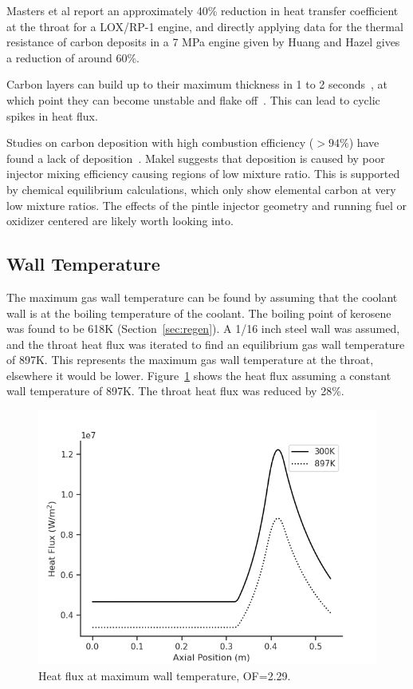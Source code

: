 \documentclass[11pt]{article}
\begin{document}
Masters et al \cite{masters_high-pressure_1988} report an approximately 40\% reduction in heat transfer coefficient at the throat for a LOX/RP-1 engine, and directly applying data for the thermal resistance of carbon deposits in a 7 MPa engine given by Huang and Hazel gives a reduction of around 60\%.

Carbon layers can build up to their maximum thickness in 1 to 2 seconds~\cite{makel_carbon_1990}, at which point they can become unstable and flake off~\cite{sellers_effect_1961}. This can lead to cyclic spikes in heat flux.

Studies on carbon deposition with high combustion efficiency ($>94\%$) have found a lack of deposition~\cite{makel_carbon_1990, lausten_carbon_1985}. Makel suggests that deposition is caused by poor injector mixing efficiency causing regions of low mixture ratio. This is supported by chemical equilibrium calculations, which only show elemental carbon at very low mixture ratios. The effects of the pintle injector geometry and running fuel or oxidizer centered are likely worth looking into.

\subsection{Wall Temperature}\label{sec:wall_temp}

The maximum gas wall temperature can be found by assuming that the coolant wall is at the boiling temperature of the coolant. The boiling point of kerosene was found to be 618K (Section~\ref{sec:regen}). A 1/16 inch steel wall was assumed, and the throat heat flux was iterated to find an equilibrium gas wall temperature of 897K. This represents the maximum gas wall temperature at the throat, elsewhere it would be lower. Figure~\ref{fig:wall_temp} shows the heat flux assuming a constant wall temperature of 897K. The throat heat flux was reduced by 28\%.

\begin{figure}[H]
  \centering
  \includegraphics[width=0.5\linewidth]{Wall_Temp.png}
  \caption{Heat flux at maximum wall temperature, OF=2.29.}
  \label{fig:wall_temp}
\end{figure}
\end{document}
